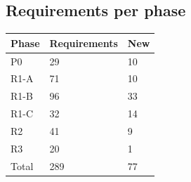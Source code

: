 \subsection*{Requirements per phase}
\begin{longtable}{@{}P{0.14\textwidth}P{0.16\textwidth}P{0.12\textwidth}@{}}
\toprule Phase & Requirements & New\\\midrule
P0 & 29 & 10\\
R1-A & 71 & 10\\
R1-B & 96 & 33\\
R1-C & 32 & 14\\
R2 & 41 & 9\\
R3 & 20 & 1\\
\midrule Total & 289 & 77\\
\bottomrule
\end{longtable}

